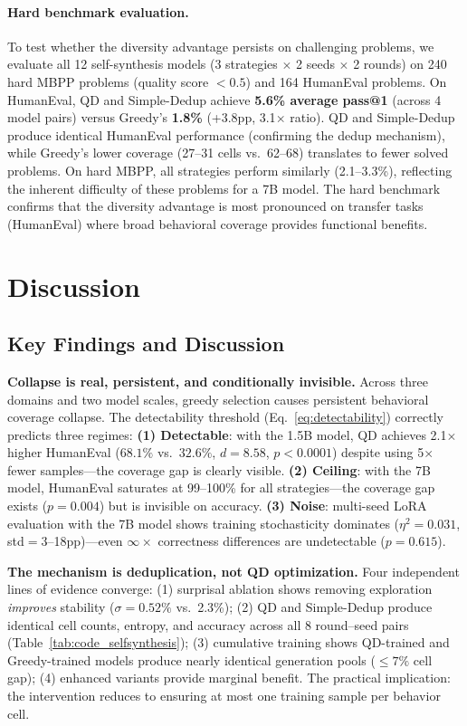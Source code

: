 \documentclass{article}
\begin{document}
\begin{enumerate}[nosep]
\paragraph{Hard benchmark evaluation.}
To test whether the diversity advantage persists on challenging problems, we evaluate all 12 self-synthesis models (3 strategies $\times$ 2 seeds $\times$ 2 rounds) on 240 hard MBPP problems (quality score $< 0.5$) and 164 HumanEval problems.
On HumanEval, QD and Simple-Dedup achieve \textbf{5.6\% average pass@1} (across 4 model pairs) versus Greedy's \textbf{1.8\%} (+3.8pp, 3.1$\times$ ratio).
QD and Simple-Dedup produce identical HumanEval performance (confirming the dedup mechanism), while Greedy's lower coverage (27--31 cells vs.\ 62--68) translates to fewer solved problems.
On hard MBPP, all strategies perform similarly (2.1--3.3\%), reflecting the inherent difficulty of these problems for a 7B model.
The hard benchmark confirms that the diversity advantage is most pronounced on transfer tasks (HumanEval) where broad behavioral coverage provides functional benefits.

\section{Discussion}
\label{sec:discussion}

\subsection{Key Findings and Discussion}

\textbf{Collapse is real, persistent, and conditionally invisible.}
Across three domains and two model scales, greedy selection causes persistent behavioral coverage collapse.
The detectability threshold (Eq.~\ref{eq:detectability}) correctly predicts three regimes:
\textbf{(1) Detectable}: with the 1.5B model, QD achieves 2.1$\times$ higher HumanEval ($68.1\%$ vs.\ $32.6\%$, $d{=}8.58$, $p{<}0.0001$) despite using 5$\times$ fewer samples---the coverage gap is clearly visible.
\textbf{(2) Ceiling}: with the 7B model, HumanEval saturates at 99--100\% for all strategies---the coverage gap exists ($p{=}0.004$) but is invisible on accuracy.
\textbf{(3) Noise}: multi-seed LoRA evaluation with the 7B model shows training stochasticity dominates ($\eta^2{=}0.031$, std${=}3$--18pp)---even $\infty\times$ correctness differences are undetectable ($p{=}0.615$).

\textbf{The mechanism is deduplication, not QD optimization.}
Four independent lines of evidence converge: (1) surprisal ablation shows removing exploration \emph{improves} stability ($\sigma{=}0.52\%$ vs.\ 2.3\%); (2) QD and Simple-Dedup produce identical cell counts, entropy, and accuracy across all 8 round--seed pairs (Table~\ref{tab:code_selfsynthesis}); (3) cumulative training shows QD-trained and Greedy-trained models produce nearly identical generation pools (${\leq}7\%$ cell gap); (4) enhanced variants provide marginal benefit.
The practical implication: the intervention reduces to ensuring at most one training sample per behavior cell.


\end{enumerate}
\end{document}
